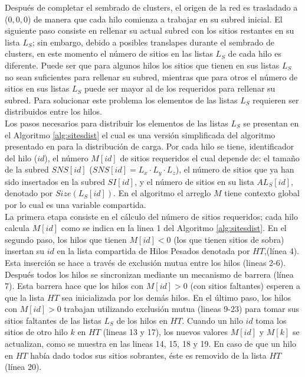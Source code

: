 Después de completar el sembrado de clusters, el origen de la red es trasladado a ($0, 0, 0$) de manera que cada hilo
comienza a trabajar en su subred inicial. El siguiente paso consiste en rellenar su actual subred con los sitios restantes 
en su lista $L_S$; sin embargo, debido a posibles translapes durante el sembrado de clusters, en este momento el número 
de sitios en las listas $L_S$ de cada hilo es diferente. Puede ser que para algunos hilos los sitios que tienen en sus 
listas $L_S$ no sean suficientes para rellenar su subred, mientras que para otros el número de sitios en sus listas $L_S$ puede 
ser mayor al de los requeridos para rellenar su subred. Para solucionar este problema los elementos de las listas $L_S$ 
requieren ser distribuidos entre los hilos.\\

Los pasos necesarios para distribuir los elementos de las listas $L_S$ se presentan en el Algoritmo \ref{alg:sitesdist} el 
cual es una versión simplificada del algoritmo presentado en \cite{ref11} para la distribución de carga. Por cada hilo se tiene, identificador del hilo ($id$), el número $M[id]$ de sitios requeridos el cual depende de: el tamaño  de la subred $SNS[id]$ ($SNS[id] = L_x \cdot L_y \cdot L_z$), el número de sitios que ya han sido insertados en la subred $SI[id]$, y el número de sitios en su lista $AL_S[id]$, denotado por $Size(L_S[id])$. En el algoritmo el arreglo $M$ tiene contexto global  por lo cual es una variable compartida.\\

La primera etapa consiste en el cálculo del número de sitios requeridos; cada hilo calcula $M[id]$ como se indica en la linea 
1 del Algoritmo \ref{alg:sitesdist}. En el segundo paso, los hilos que tienen $M[id]<0$ (los que tienen sitios de 
sobra) insertan su $id$ en la lista compartida de Hilos Pesados denotada por $HT$,(línea 4). Esta inserción 
se hace a través de exclusión mutua entre los hilos (lineas 2-6). Después todos los hilos se sincronizan mediante un 
mecanismo de barrera (línea 7). Esta barrera hace que los hilos con $M[id]>0$ (con sitios faltantes) esperen a que 
la lista $HT$ sea inicializada por los demás hilos. En el último paso, los hilos con $M[id] > 0$ trabajan utilizando 
exclusión mutua (lineas 9-23) para tomar sus sitios faltantes de las listas $L_S$ de los hilos en $HT$. Cuando un hilo $id$ 
toma los sitios de otro hilo $k$ en $HT$ (lineas 13 y 17), los nuevos valores $M[id]$ y $M[k]$ se actualizan, como se 
muestra en las lineas 14, 15, 18 y 19. En caso de que un hilo en $HT$ había dado todos sus sitios sobrantes, éste es removido 
de la lista $HT$ (línea 20).\\

